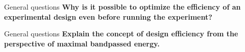 \documentclass{beamer}
\begin{document}
\begin{frame}{General questions}
  \textbf{Why is it possible to optimize the efficiency of an experimental design even before running the experiment?}

%
%

\end{frame}

%
%
%
%



\begin{frame}{General questions}
  \textbf{Explain the concept of design efficiency from the perspective of maximal bandpassed energy.}

\end{frame}
\end{document}
